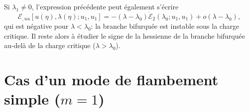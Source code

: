 \documentclass[12pt, final]{amsart}
\begin{document}
Si $\lambda_1 \neq 0$, l'expression précédente peut également
s'écrire
\begin{equation}
  \mathcal{E}_{, u  u} [u (\eta), \lambda (\eta) ; u_1, u_1] = -
  (\lambda - \lambda_0)  \dot{\mathcal{E}}_2 (\lambda_0 ; u_1, u_1) + o
  (\lambda - \lambda_0),
\end{equation}
qui est négative pour $\lambda < \lambda_0$: la branche bifurquée est
instable sous la charge critique. Il reste alors {\`a} étudier le signe de
la hessienne de la branche bifurquée au-del{\`a} de la charge critique
($\lambda > \lambda_0$).

\section{Cas d'un mode de flambement simple ($m = 1$)}
\end{document}
